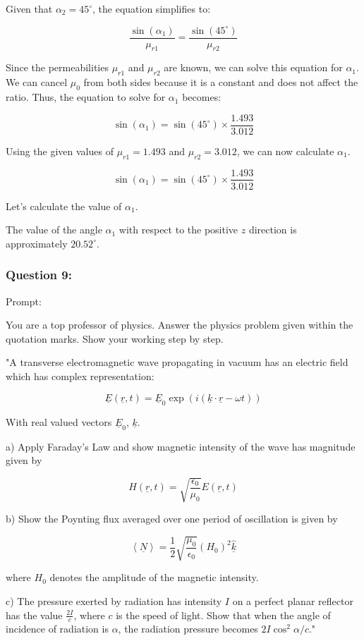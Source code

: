 \documentclass[a4paper,11pt]{article}
\begin{document}
Given that \(\alpha_{2} = 45^\circ\), the equation simplifies to:

\[
\frac{\sin(\alpha_{1})}{\mu_{r1}} = \frac{\sin(45^\circ)}{\mu_{r2}}
\]

Since the permeabilities \(\mu_{r1}\) and \(\mu_{r2}\) are known, we can solve this equation for \(\alpha_{1}\). We can cancel \(\mu_0\) from both sides because it is a constant and does not affect the ratio. Thus, the equation to solve for \(\alpha_{1}\) becomes:

\[
\sin(\alpha_{1}) = \sin(45^\circ) \times \frac{1.493}{3.012}
\]

Using the given values of \(\mu_{r1} = 1.493\) and \(\mu_{r2} = 3.012\), we can now calculate \(\alpha_{1}\).

\[
\sin(\alpha_{1}) = \sin(45^\circ) \times \frac{1.493}{3.012}
\]

Let's calculate the value of \(\alpha_{1}\).

The value of the angle \(\alpha_{1}\) with respect to the positive \(z\) direction is approximately \(20.52^\circ\).

\subsubsection*{Question 9:}

Prompt:
\begin{spverbatim}
    You are a top professor of physics. Answer the physics problem given within the quotation marks. Show your working step by step.

    "A transverse electromagnetic wave propagating in vacuum has an electric field which has complex representation:

    \[ \underline{E}(\underline{r}, t) = \underline{E}_{0} \exp (i(\underline{k} \cdot \underline{r} - \omega t)) \]

    With real valued vectors \( \underline{E}_{0} \), \( \underline{k} \).

    a) Apply Faraday’s Law and show magnetic intensity of the wave has magnitude given by 

    \[ H(\underline{r}, t) = \sqrt{\frac{\epsilon_{0}}{\mu_{0}}} E(\underline{r}, t) \]

    b) Show the Poynting flux averaged over one period of oscillation is given by 

    \[ \left< \underline{N} \right> = \frac{1}{2} \sqrt{\frac{\mu_{0}}{\epsilon_{0}}} (H_{0})^{2} \hat{\underline{k}} \]

    where \( H_{0} \) denotes the amplitude of the magnetic intensity.
    
    c) The pressure exerted by radiation has intensity \( I \) on a perfect planar reflector has the value \( \frac{2I}{c} \), where \( c \) is the speed of light. Show that when the angle of incidence of radiation is \( \alpha \), the radiation pressure becomes \( 2I\cos^{2}{\alpha}/{c} \)."
\end{spverbatim}
\end{document}
